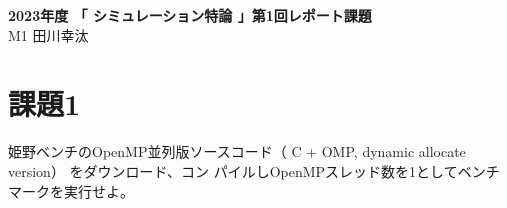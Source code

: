 \documentclass[]{jarticle}          %
\begin{document}

\vspace*{2ex}
\begin{center}
 {\Large \bf 2023年度 「 シミュレーション特論 」第1回レポート課題}\\ %
 \vspace*{5mm}
 {\large M1 田川幸汰}%
\end{center}






\section{課題1}
姫野ベンチのOpenMP並列版ソースコード（ C + OMP, dynamic allocate version） をダウンロード、コン
パイルしOpenMPスレッド数を1としてベンチマークを実行せよ。
\end{document}
